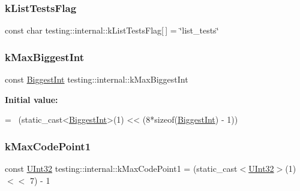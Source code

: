 \mbox{\label{namespacetesting_1_1internal_a1d3cfebffefbf35f7033d4941493a8ff}} 
\subsubsection{\texorpdfstring{k\+List\+Tests\+Flag}{kListTestsFlag}}
{\footnotesize\ttfamily const char testing\+::internal\+::k\+List\+Tests\+Flag\mbox{[}$\,$\mbox{]} = \char`\"{}list\+\_\+tests\char`\"{}}

\mbox{\label{namespacetesting_1_1internal_ad901880198832bc166d2493096b451f7}} 
\subsubsection{\texorpdfstring{k\+Max\+Biggest\+Int}{kMaxBiggestInt}}
{\footnotesize\ttfamily const \hyperlink{namespacetesting_1_1internal_a05c6bd9ede5ccdf25191a590d610dcc6}{Biggest\+Int} testing\+::internal\+::k\+Max\+Biggest\+Int}

{\bfseries Initial value\+:}
\begin{DoxyCode}
=
    ~(\textcolor{keyword}{static\_cast<}\hyperlink{namespacetesting_1_1internal_a05c6bd9ede5ccdf25191a590d610dcc6}{BiggestInt}\textcolor{keyword}{>}(1) << (8*\textcolor{keyword}{sizeof}(\hyperlink{namespacetesting_1_1internal_a05c6bd9ede5ccdf25191a590d610dcc6}{BiggestInt}) - 1))
\end{DoxyCode}
\mbox{\label{namespacetesting_1_1internal_a128515c8ed6c0fe98e498c8042da2060}} 
\subsubsection{\texorpdfstring{k\+Max\+Code\+Point1}{kMaxCodePoint1}}
{\footnotesize\ttfamily const \hyperlink{namespacetesting_1_1internal_a40d4fffcd2bf56f18b1c380615aa85e3}{U\+Int32} testing\+::internal\+::k\+Max\+Code\+Point1 = (static\+\_\+cast$<$\hyperlink{namespacetesting_1_1internal_a40d4fffcd2bf56f18b1c380615aa85e3}{U\+Int32}$>$(1) $<$$<$ 7) -\/ 1}

